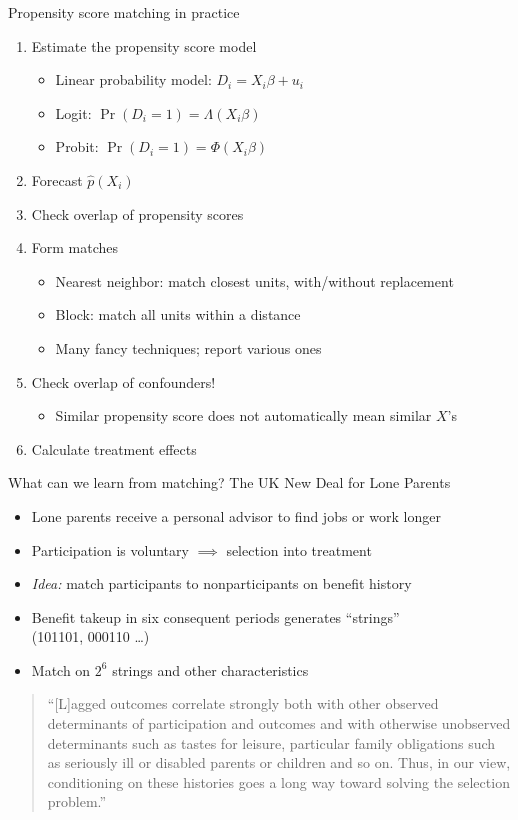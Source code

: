 \documentclass[aspectratio=169,compress,handout,t,xcolor=table]{beamer}
\begin{document}
\begin{frame}{Propensity score matching in practice}
  \begin{enumerate}
    \item Estimate the propensity score model
    \begin{itemize}
      \item Linear probability model: \(D_i = X_i \beta + u_i\)
      \item Logit: \(\Pr(D_i=1) = \Lambda(X_i \beta)\)
      \item Probit: \(\Pr(D_i=1) = \Phi(X_i \beta)\)
    \end{itemize}
    \item Forecast \(\hat{p}(X_i)\)
    \item Check overlap of propensity scores
    \item Form matches
    \begin{itemize}
      \item Nearest neighbor: match closest units, with/without replacement
      \item Block: match all units within a distance
      \item Many fancy techniques; report various ones
    \end{itemize}
    \item Check overlap of confounders!
    \begin{itemize}
      \item Similar propensity score does not automatically mean similar \(X\)'s
    \end{itemize}
    \item Calculate treatment effects
  \end{enumerate}
\end{frame}

\begin{frame}{What can we learn from matching? }
  The UK New Deal for Lone Parents \citep*[][IZA DP]{Dolton2011}
  \begin{itemize}
    \item Lone parents receive a personal advisor to find jobs or work longer
    \item Participation is voluntary \(\implies\) selection into treatment
    \item \emph{Idea:} match participants to nonparticipants on benefit history
    \item Benefit takeup in six consequent periods generates ``strings'' \\ (101101, 000110 \ldots)
    \item Match on \(2^6\) strings and other characteristics
  \end{itemize}
  \begin{quote}
    \footnotesize ``[L]agged outcomes correlate strongly both with other observed determinants of participation and outcomes and with otherwise unobserved determinants such as tastes for leisure, particular family obligations such as seriously ill or disabled parents or children and so on. Thus, in our view, conditioning on these histories goes a long way toward solving the selection problem.''
  \end{quote}
\end{frame}
\end{document}
